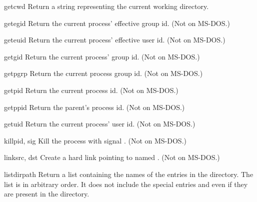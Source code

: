 \begin{funcdesc}{getcwd}{}
Return a string representing the current working directory.
\end{funcdesc}

\begin{funcdesc}{getegid}{}
Return the current process' effective group id.
(Not on MS-DOS.)
\end{funcdesc}

\begin{funcdesc}{geteuid}{}
Return the current process' effective user id.
(Not on MS-DOS.)
\end{funcdesc}

\begin{funcdesc}{getgid}{}
Return the current process' group id.
(Not on MS-DOS.)
\end{funcdesc}

\begin{funcdesc}{getpgrp}{}
Return the current process group id.
(Not on MS-DOS.)
\end{funcdesc}

\begin{funcdesc}{getpid}{}
Return the current process id.
(Not on MS-DOS.)
\end{funcdesc}

\begin{funcdesc}{getppid}{}
Return the parent's process id.
(Not on MS-DOS.)
\end{funcdesc}

\begin{funcdesc}{getuid}{}
Return the current process' user id.
(Not on MS-DOS.)
\end{funcdesc}

\begin{funcdesc}{kill}{pid, sig}
Kill the process  with signal .
(Not on MS-DOS.)
\end{funcdesc}

\begin{funcdesc}{link}{src, dst}
Create a hard link pointing to  named .
(Not on MS-DOS.)
\end{funcdesc}

\begin{funcdesc}{listdir}{path}
Return a list containing the names of the entries in the directory.
The list is in arbitrary order.  It does not include the special
entries  and  even if they are present in the
directory.
\end{funcdesc}

